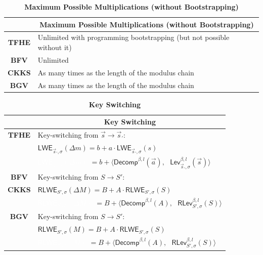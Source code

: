 \begin{table}[h]
\begin{tabular}{|c||l|}
\hline
&\multicolumn{1}{c|}{\textbf{Maximum Possible Multiplications (without Bootstrapping)}}\\\hline\hline
\textbf{TFHE}&Unlimited with programming bootstrapping (but not possible without it)\\\hline
\textbf{BFV}&Unlimited\\\hline
\textbf{CKKS}&As many times as the length of the modulus chain\\\hline
\textbf{BGV}&As many times as the length of the modulus chain\\\hline
\end{tabular}
\caption{\textbf{Maximum Possible Multiplications (without Bootstrapping)}}
\end{table}

\begin{table}[h]
\begin{tabular}{|c||l|}
\hline
&\multicolumn{1}{c|}{\textbf{Key Switching}}\\\hline\hline
\textbf{TFHE}& Key-switching from $\vec{s} \rightarrow \vec{s}_{'}$:\\
&$\textsf{LWE}_{\vec{s}_{'},\sigma}(\Delta m) = b + a\cdot \textsf{LWE}_{\vec{s}_{'}, \sigma}(s)$\\
&\textcolor{white}{$\textsf{LWE}_{\vec{s}_{'},\sigma}(\Delta m) $} $ = b + \bm{\langle} \textsf{Decomp}^{\beta, l}(\vec{a}), \text{ } \textsf{Lev}_{\vec{s}_{'}, \sigma}^{\beta, l}(\vec{s}) \bm{\rangle}$\\\hline
\textbf{BFV}& Key-switching from $S \rightarrow S'$:\\
\textbf{CKKS}&$\textsf{RLWE}_{S',\sigma}(\Delta M) = B + A\cdot \textsf{RLWE}_{S', \sigma}(S)$\\
&\textcolor{white}{$\textsf{RLWE}_{S',\sigma}(\Delta M) $} $ = B + \bm{\langle} \textsf{Decomp}^{\beta, l}(A), \text{ } \textsf{RLev}_{S', \sigma}^{\beta, l}(S) \bm{\rangle}$\\\hline
\textbf{BGV}& Key-switching from $S \rightarrow S'$:\\
&$\textsf{RLWE}_{S',\sigma}(M) = B + A\cdot \textsf{RLWE}_{S', \sigma}(S)$\\
&\textcolor{white}{$\textsf{RLWE}_{S',\sigma}(M) $} $ = B + \bm{\langle} \textsf{Decomp}^{\beta, l}(A), \text{ } \textsf{RLev}_{S', \sigma}^{\beta, l}(S) \bm{\rangle}$\\\hline
\end{tabular}
\caption{\textbf{Key Switching}}
\end{table}


